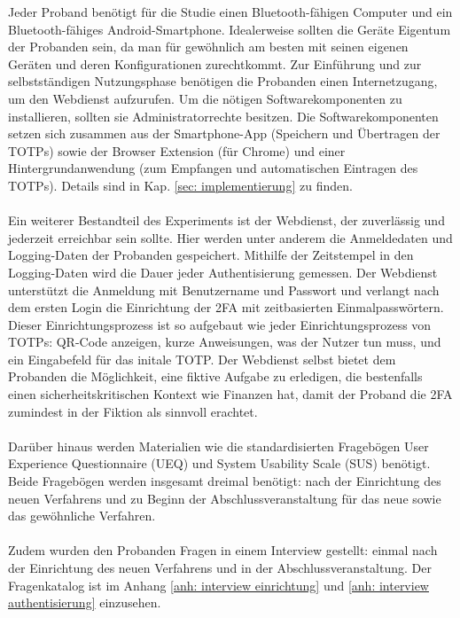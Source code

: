 Jeder Proband benötigt für die Studie einen Bluetooth-fähigen Computer und ein 
Bluetooth-fähiges Android-Smartphone. Idealerweise sollten die Geräte Eigentum der 
Probanden sein, da man für gewöhnlich am besten mit seinen eigenen Geräten und 
deren Konfigurationen zurechtkommt. Zur Einführung und zur selbstständigen 
Nutzungsphase benötigen die Probanden einen Internetzugang, um den Webdienst 
aufzurufen. Um die nötigen Softwarekomponenten zu installieren, sollten sie 
Administratorrechte besitzen. Die Softwarekomponenten setzen sich zusammen aus 
der Smartphone-App (Speichern und Übertragen der TOTPs) sowie der Browser 
Extension (für Chrome) und einer Hintergrundanwendung (zum Empfangen und 
automatischen Eintragen des TOTPs). Details sind in Kap. \ref{sec: implementierung} zu finden.
\\\\
Ein weiterer Bestandteil des Experiments ist der Webdienst, der zuverlässig und 
jederzeit erreichbar sein sollte. Hier werden unter anderem die Anmeldedaten und 
Logging-Daten der Probanden gespeichert. Mithilfe der Zeitstempel in den 
Logging-Daten wird die Dauer jeder Authentisierung gemessen. Der Webdienst 
unterstützt die Anmeldung mit Benutzername und Passwort und verlangt nach dem 
ersten Login die Einrichtung der 2FA mit zeitbasierten Einmalpasswörtern. Dieser 
Einrichtungsprozess ist so aufgebaut wie jeder Einrichtungsprozess von TOTPs: 
QR-Code anzeigen, kurze Anweisungen, was der Nutzer tun muss, und ein Eingabefeld 
für das initale TOTP. Der Webdienst selbst bietet dem Probanden die Möglichkeit, 
eine fiktive Aufgabe zu erledigen, die bestenfalls einen sicherheitskritischen 
Kontext wie Finanzen hat, damit der Proband die 2FA zumindest in der Fiktion als 
sinnvoll erachtet.
\\\\
Darüber hinaus werden Materialien wie die standardisierten Fragebögen User 
Experience Questionnaire (UEQ) \autocite{Schrepp} und System Usability Scale (SUS)
\autocite{Brooke} benötigt. Beide Fragebögen werden insgesamt dreimal benötigt: 
nach der Einrichtung des neuen Verfahrens und zu Beginn der 
Abschlussveranstaltung für das neue sowie das gewöhnliche Verfahren.
\\\\
Zudem wurden den Probanden Fragen in einem Interview gestellt: einmal nach der 
Einrichtung des neuen Verfahrens und in der Abschlussveranstaltung. Der 
Fragenkatalog ist im Anhang \ref{anh: interview einrichtung} und \ref{anh: interview authentisierung} einzusehen. 

